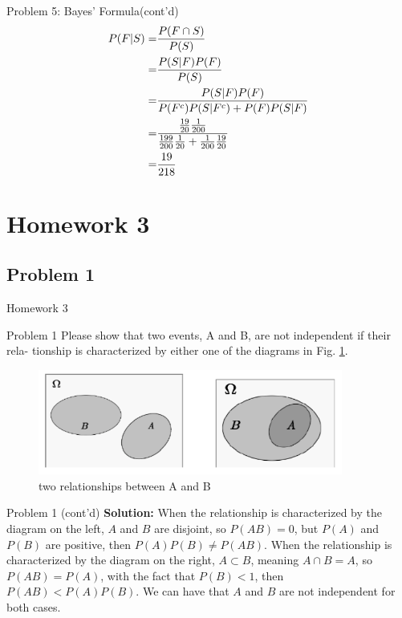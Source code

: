 \documentclass{beamer}
\begin{document}
\begin{frame}{Problem 5: Bayes' Formula(cont'd)}
    \begin{align}
        P(F|S)=&\frac{P(F\cap S)}{P(S)}\notag\\
        =&\frac{P(S|F)P(F)}{P(S)}\notag\\
        =&\frac{P(S|F)P(F)}{P(F^c)P(S|F^c)+P(F)P(S|F)}\notag\\
        =&\frac{\frac{19}{20}\frac{1}{200}}{\frac{199}{200}\frac{1}{20}+\frac{1}{200}\frac{19}{20}}\notag\\
        =&\frac{19}{218}\notag
    \end{align}
\end{frame}

\section{Homework 3}
\subsection{Problem 1}
\begin{frame}
\center \huge Homework 3
\end{frame}

\begin{frame}{Problem 1}
Please show that two events, A and B, are not independent if their rela- tionship is characterized by either one of the diagrams in Fig. \ref{fig1}.
\begin{figure}
\includegraphics[width=10cm]{fig1}
\caption{\label{fig1}two relationships between A and B}
\end{figure}
\end{frame}

\begin{frame}{Problem 1 (cont'd)}
\textbf{Solution:}
When the relationship is characterized by the diagram on the left, $A$ and $B$ are disjoint, so $P(AB) = 0$, but $P(A)$ and $P(B)$ are positive, then $P(A)P(B)\neq P(AB)$.
\vspace{0.2cm}
When the relationship is characterized by the diagram on the right, $A\subset B$, meaning $A\cap B = A$, so $P(AB) = P(A)$, with the fact that $P(B) < 1$, then $P(AB) < P(A)P(B)$.
\vspace{0.2cm}
We can have that $A$ and $B$ are not independent for both cases.
\vspace{4cm}
\end{frame}
\end{document}

